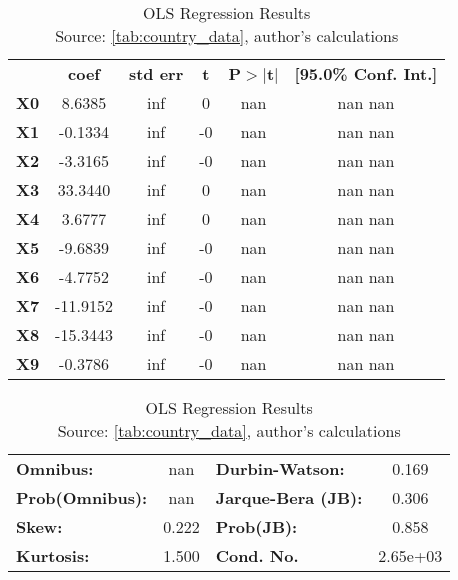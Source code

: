 \begin{table}[!htbp]
\begin{center}
    \begin{tabular}{lccccc}
                & \textbf{coef} & \textbf{std err} & \textbf{t} & \textbf{P$>$$|$t$|$} & \textbf{[95.0\% Conf. Int.]}  \\
        \textbf{X0} &       8.6385  &          inf     &         0  &           nan        &           nan       nan       \\
        \textbf{X1} &      -0.1334  &          inf     &        -0  &           nan        &           nan       nan       \\
        \textbf{X2} &      -3.3165  &          inf     &        -0  &           nan        &           nan       nan       \\
        \textbf{X3} &      33.3440  &          inf     &         0  &           nan        &           nan       nan       \\
        \textbf{X4} &       3.6777  &          inf     &         0  &           nan        &           nan       nan       \\
        \textbf{X5} &      -9.6839  &          inf     &        -0  &           nan        &           nan       nan       \\
        \textbf{X6} &      -4.7752  &          inf     &        -0  &           nan        &           nan       nan       \\
        \textbf{X7} &     -11.9152  &          inf     &        -0  &           nan        &           nan       nan       \\
        \textbf{X8} &     -15.3443  &          inf     &        -0  &           nan        &           nan       nan       \\
        \textbf{X9} &      -0.3786  &          inf     &        -0  &           nan        &           nan       nan       \\

        \end{tabular}
        \begin{tabular}{lclc}
        \textbf{Omnibus:}       &    nan & \textbf{  Durbin-Watson:     } &    0.169  \\
        \textbf{Prob(Omnibus):} &    nan & \textbf{  Jarque-Bera (JB):  } &    0.306  \\
        \textbf{Skew:}          &  0.222 & \textbf{  Prob(JB):          } &    0.858  \\
        \textbf{Kurtosis:}      &  1.500 & \textbf{  Cond. No.          } & 2.65e+03  \\
    \bottomrule
    \end{tabular}
    \caption{OLS Regression Results\\Source: \ref{tab:country_data}, author's calculations}
    \label{tab:ols_1}
    \end{center}
    \hspace*{-1.2cm}
\end{table}

